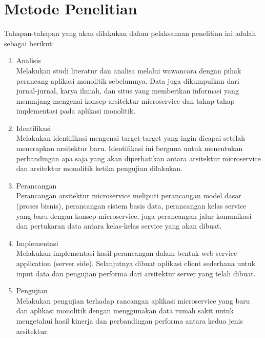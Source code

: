 \section{Metode Penelitian}
Tahapan-tahapan yang akan dilakukan dalam pelaksanaan penelitian ini adalah sebagai berikut:
\begin{enumerate}[nolistsep,leftmargin=0.5cm]
\item Analisis\\
Melakukan studi literatur dan analisa melalui wawancara dengan pihak perancang aplikasi monolitik sebelumnya. Data juga dikumpulkan dari jurnal-jurnal, karya ilmiah, dan situs yang memberikan informasi yang menunjang mengenai konsep arsitektur microservice dan tahap-tahap implementasi pada aplikasi monolitik.
\item Identifikasi\\
Melakukan identifikasi mengenai target-target yang ingin dicapai setelah menerapkan arsitektur baru. Identifikasi ini berguna untuk menentukan perbandingan apa saja yang akan diperhatikan antara arsitektur microservice dan arsitektur monolitik ketika pengujian dilakukan.
\item Perancangan\\
Perancangan arsitektur microservice meliputi perancangan model dasar (proses bisnis), perancangan sistem basis data, perancangan kelas service yang baru dengan konsep microservice, juga perancangan jalur komunikasi dan pertukaran data antara kelas-kelas service yang akan dibuat.
\item Implementasi\\
Melakukan implementasi hasil perancangan dalam bentuk web service application (server side). Selanjutnya dibuat aplikasi client sederhana untuk input data dan pengujian performa dari arsitektur server yang telah dibuat.
\item Pengujian\\
Melakukan pengujian terhadap rancangan aplikasi microservice yang baru dan aplikasi monolitik dengan menggunakan data rumah sakit untuk mengetahui hasil kinerja dan perbandingan performa antara kedua jenis arsitektur.
\end{enumerate}

